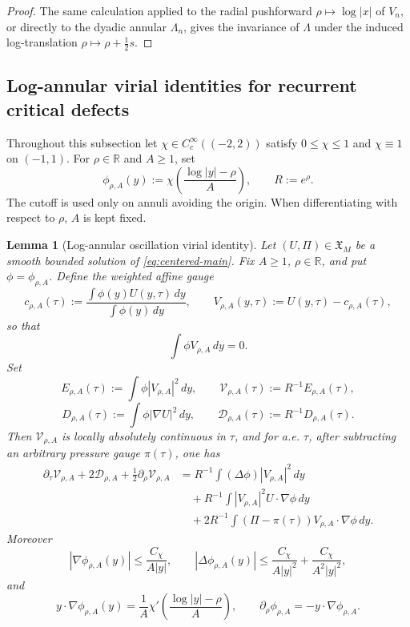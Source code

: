\documentclass[11pt]{amsart}
\numberwithin{equation}{section}
\theoremstyle{plain}
\newtheorem{lemma}[lemma]{Lemma}
\theoremstyle{definition}
\theoremstyle{remark}
\begin{document}
\begin{proof}
The same calculation applied to the radial pushforward
\(\rho\mapsto\log|x|\) of \(V_n\), or directly to the dyadic annular
\(\Lambda_n\), gives the invariance of \(\Lambda\) under the induced
log-translation \(\rho\mapsto\rho+\tfrac12 s\).
\end{proof}

\subsection{Log-annular virial identities for recurrent critical defects}
\label{subsec:log-annular-virial-critical-defects}

Throughout this subsection let
\(\chi\in C_c^\infty((-2,2))\) satisfy \(0\le\chi\le1\) and
\(\chi\equiv1\) on \((-1,1)\).  For \(\rho\in\mathbb R\) and \(A\ge1\), set
\[
   \phi_{\rho,A}(y)
   :=
   \chi\!\left(\frac{\log |y|-\rho}{A}\right),
   \qquad R:=e^\rho .
\]
The cutoff is used only on annuli avoiding the origin.  When differentiating
with respect to \(\rho\), \(A\) is kept fixed.

\begin{lemma}[Log-annular oscillation virial identity]
\label{lem:log-annular-oscillation-virial}
Let \((U,\Pi)\in\mathfrak X_M\) be a smooth bounded solution of
\eqref{eq:centered-main}.  Fix \(A\ge1\), \(\rho\in\mathbb R\), and put
\(\phi=\phi_{\rho,A}\).  Define the weighted affine gauge
\[
   c_{\rho,A}(\tau)
   :=
   \frac{\int \phi(y)U(y,\tau)\,dy}{\int \phi(y)\,dy},
   \qquad
   V_{\rho,A}(y,\tau):=U(y,\tau)-c_{\rho,A}(\tau),
\]
so that
\[
   \int \phi V_{\rho,A}\,dy=0 .
\]
Set
\[
   E_{\rho,A}(\tau):=\int \phi |V_{\rho,A}|^2\,dy,
   \qquad
   \mathcal V_{\rho,A}(\tau):=R^{-1}E_{\rho,A}(\tau),
\]
\[
   D_{\rho,A}(\tau):=\int \phi |\nabla U|^2\,dy,
   \qquad
   \mathcal D_{\rho,A}(\tau):=R^{-1}D_{\rho,A}(\tau).
\]
Then \(\mathcal V_{\rho,A}\) is locally absolutely continuous in \(\tau\), and
for a.e. \(\tau\), after subtracting an arbitrary pressure gauge \(\pi(\tau)\),
one has
\begin{equation}
\label{eq:log-annular-virial-identity}
\begin{aligned}
   \partial_\tau \mathcal V_{\rho,A}
   +2\mathcal D_{\rho,A}
   +\frac12\partial_\rho \mathcal V_{\rho,A}
   &=
   R^{-1}\int (\Delta\phi)|V_{\rho,A}|^2\,dy                         \\
   &\quad
   +R^{-1}\int |V_{\rho,A}|^2U\cdot\nabla\phi\,dy                    \\
   &\quad
   +2R^{-1}\int (\Pi-\pi(\tau))V_{\rho,A}\cdot\nabla\phi\,dy .
\end{aligned}
\end{equation}
Moreover
\begin{equation}
\label{eq:log-cutoff-derivative-bounds}
   |\nabla\phi_{\rho,A}(y)|\le \frac{C_\chi}{A|y|},
   \qquad
   |\Delta\phi_{\rho,A}(y)|\le
   \frac{C_\chi}{A|y|^2}+\frac{C_\chi}{A^2|y|^2},
\end{equation}
and
\[
   y\cdot\nabla\phi_{\rho,A}(y)
   =
   \frac1A\chi'\!\left(\frac{\log |y|-\rho}{A}\right),
   \qquad
   \partial_\rho\phi_{\rho,A}=-y\cdot\nabla\phi_{\rho,A}.
\]
\end{lemma}
\end{document}
